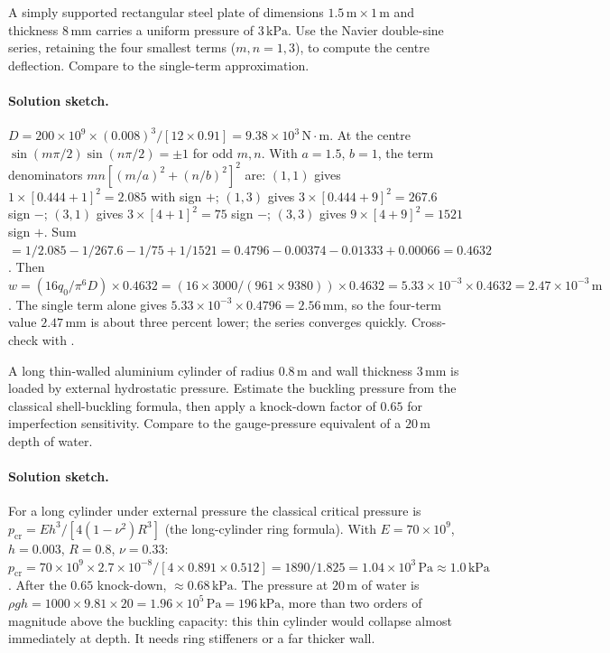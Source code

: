 \begin{exercise}
A simply supported rectangular steel plate of dimensions $1.5\,
\si{\meter} \times 1\,\si{\meter}$ and thickness $8\,\si{\milli
\meter}$ carries a uniform pressure of $3\,\text{kPa}$. Use the
Navier double-sine series, retaining the four smallest terms
($m, n = 1, 3$), to compute the centre deflection. Compare to the
single-term approximation.

\paragraph{Solution sketch.} $D = 200\times 10^9\times (0.008)^3/
[12\times 0.91] = 9.38\times 10^3\,\text{N}\cdot\text{m}$. At the
centre $\sin(m\pi/2)\sin(n\pi/2) = \pm 1$ for odd $m,n$. With $a =
1.5$, $b = 1$, the term denominators $mn[(m/a)^2+(n/b)^2]^2$ are:
$(1,1)$ gives $1\times[0.444+1]^2 = 2.085$ with sign $+$; $(1,3)$
gives $3\times[0.444+9]^2 = 267.6$ sign $-$; $(3,1)$ gives $3\times
[4+1]^2 = 75$ sign $-$; $(3,3)$ gives $9\times[4+9]^2 = 1521$ sign
$+$. Sum $= 1/2.085 - 1/267.6 - 1/75 + 1/1521 = 0.4796 - 0.00374 -
0.01333 + 0.00066 = 0.4632$. Then $w = (16 q_0/\pi^6 D)\times 0.4632 =
(16\times 3000/(961\times 9380))\times 0.4632 = 5.33\times 10^{-3}
\times 0.4632 = 2.47\times 10^{-3}\,\text{m}$. The single term alone
gives $5.33\times 10^{-3}\times 0.4796 = 2.56\,\si{\milli\meter}$, so
the four-term value $2.47\,\si{\milli\meter}$ is about three percent
lower; the series converges quickly. Cross-check with
.
\end{exercise}

\begin{exercise}
A long thin-walled aluminium cylinder of radius $0.8\,\si{\meter}$
and wall thickness $3\,\si{\milli\meter}$ is loaded by external
hydrostatic pressure. Estimate the buckling pressure from the
classical shell-buckling formula, then apply a knock-down factor
of $0.65$ for imperfection sensitivity. Compare to the
gauge-pressure equivalent of a $20\,\si{\meter}$ depth of water.

\paragraph{Solution sketch.} For a long cylinder under external
pressure the classical critical pressure is $p_{\text{cr}} = E h^3/
[4(1-\nu^2)R^3]$ (the long-cylinder ring formula). With $E = 70\times
10^9$, $h = 0.003$, $R = 0.8$, $\nu = 0.33$: $p_{\text{cr}} = 70\times
10^9\times 2.7\times 10^{-8}/[4\times 0.891\times 0.512] = 1890/1.825
= 1.04\times 10^3\,\text{Pa} \approx 1.0\,\text{kPa}$. After the $0.65$
knock-down, $\approx 0.68\,\text{kPa}$. The pressure at $20\,\si{\meter}$
of water is $\rho g h = 1000\times 9.81\times 20 = 1.96\times 10^5\,
\text{Pa} = 196\,\text{kPa}$, more than two orders of magnitude above
the buckling capacity: this thin cylinder would collapse almost
immediately at depth. It needs ring stiffeners or a far thicker wall.
\end{exercise}

